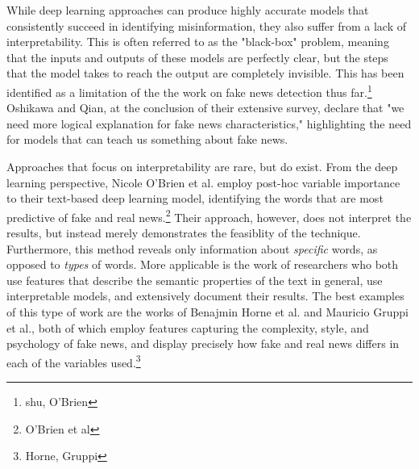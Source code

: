 \documentclass[../thesis.tex]{subfiles}
\begin{document}
While deep learning approaches can produce highly accurate models that consistently succeed in identifying misinformation, they also suffer from a lack of interpretability. This is often referred to as the "black-box" problem, meaning that the inputs and outputs of these models are perfectly clear, but the steps that the model takes to reach the output are completely invisible. This has been identified as a limitation of the the work on fake news detection thus far.\footnote{shu, O'Brien} Oshikawa and Qian, at the conclusion of their extensive survey, declare that "we need more logical explanation for fake news characteristics," highlighting the need for models that can teach us something about fake news.  

Approaches that focus on interpretability are rare, but do exist. From the deep learning perspective, Nicole O'Brien et al. employ post-hoc variable importance to their text-based deep learning model, identifying the words that are most predictive of fake and real news.\footnote{O'Brien et al} Their approach, however, does not interpret the results, but instead merely demonstrates the feasiblity of the technique. Furthermore, this method reveals only information about \emph{specific} words, as opposed to \emph{types} of words. More applicable is the work of researchers who both use features that describe the semantic properties of the text in general, use interpretable models, and extensively document their results. The best examples of this type of work are the works of Benajmin Horne et al. and Mauricio Gruppi et al., both of which employ features capturing the complexity, style, and psychology of fake news, and display precisely how fake and real news differs in each of the variables used.\footnote{Horne, Gruppi}
\end{document}
